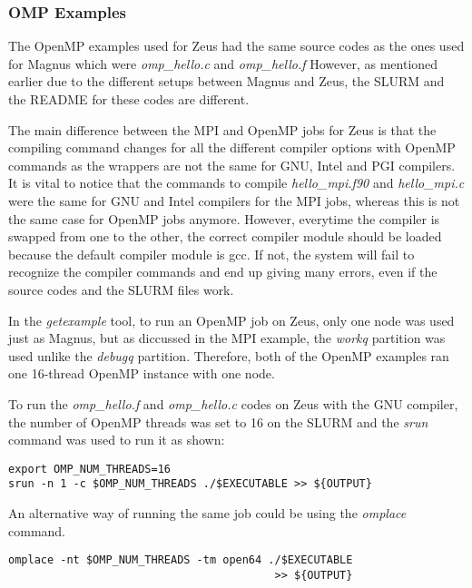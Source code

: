 \subsubsection{OMP Examples}

The OpenMP examples used for Zeus had the same source codes as the ones used for Magnus which were \emph{omp\_hello.c} and \emph{omp\_hello.f}
However, as mentioned earlier due to the different setups between Magnus and Zeus, the SLURM and the README for these codes are different.

The main difference between the MPI and OpenMP jobs for Zeus is that the compiling command changes for all the different compiler options with OpenMP
commands as the wrappers are not the same for GNU, Intel and PGI compilers. It is vital to notice that the commands to compile \emph{hello\_mpi.f90} and
\emph{hello\_mpi.c} were the same for GNU and Intel compilers for the MPI jobs, whereas this is not the same case for OpenMP jobs anymore. However, 
everytime the compiler is swapped from one to the other, the correct compiler module should be loaded because the default compiler module is gcc. If not, 
the system will fail to recognize the compiler commands and end up giving many errors, even if the source codes and the SLURM files work.

In the \emph{getexample} tool, to run an OpenMP job on Zeus, only one node was used just as Magnus, but as diccussed in the MPI example, the \emph{workq} 
partition was used unlike the \emph{debugq} partition. Therefore, both of the OpenMP examples ran one 16-thread OpenMP instance with one node.

To run the \emph{omp\_hello.f} and \emph{omp\_hello.c} codes on Zeus with the GNU compiler, the number of OpenMP threads was set to 16 on the SLURM and 
the \emph{srun} command was used to run it as shown:

\begin{tcolorbox}
\begin{Verbatim}[fontsize=\scriptsize]
export OMP_NUM_THREADS=16
srun -n 1 -c $OMP_NUM_THREADS ./$EXECUTABLE >> ${OUTPUT}
\end{Verbatim}
\end{tcolorbox}

An alternative way of running the same job could be using the \emph{omplace} command.

\begin{tcolorbox}
\begin{Verbatim}[fontsize=\scriptsize]
omplace -nt $OMP_NUM_THREADS -tm open64 ./$EXECUTABLE 
                                         >> ${OUTPUT}
\end{Verbatim}
\end{tcolorbox}

